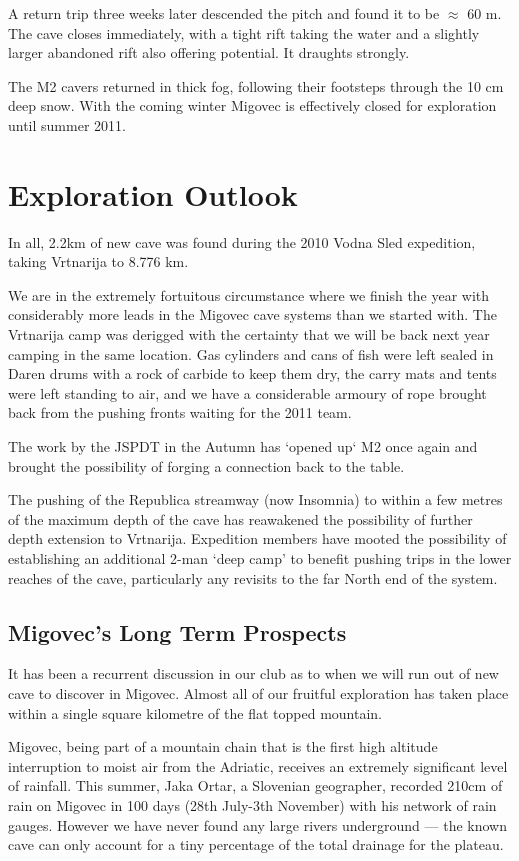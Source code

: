 A return trip three weeks later descended the pitch and found it to be
$\approx$ 60 m. The cave closes immediately, with a tight rift taking the water
and a slightly larger abandoned rift also offering potential. It draughts
strongly.

The M2 cavers returned in thick fog, following their footsteps through the 10
cm deep snow. With the coming winter Migovec is effectively closed for
exploration until summer 2011.

\section{Exploration Outlook}

In all, 2.2km of new cave was found during the 2010 Vodna Sled expedition,
taking Vrtnarija to 8.776 km.

We are in the extremely fortuitous circumstance where we finish the year with
considerably more leads in the Migovec cave systems than we started with.  The Vrtnarija camp
was derigged with the certainty that we will be back next year camping in the
same location. Gas cylinders and cans of fish were left sealed in Daren drums
with a rock of carbide to keep them dry, the carry mats and tents were left
standing to air, and we have a considerable armoury of rope brought back from
the pushing fronts waiting for the 2011 team.

The work by the JSPDT in the Autumn has `opened up` M2 once again and brought
the possibility of forging a connection back to the table. 

The pushing of the Republica streamway (now Insomnia) to within a few metres of
the maximum depth of the cave has reawakened the possibility of further depth
extension to Vrtnarija. Expedition members have mooted the possibility of
establishing an additional 2-man `deep camp' to benefit pushing trips in the
lower reaches of the cave, particularly any revisits to the far North end of
the system.

\subsection{Migovec's Long Term Prospects}

It has been a recurrent discussion in our club as to when we will run out of
new cave to discover in Migovec. Almost all of our fruitful exploration has
taken place within a single square kilometre of the flat topped mountain. 

Migovec, being part of a mountain chain that is the first high altitude
interruption to moist air from the Adriatic, receives an extremely significant
level of rainfall. This summer, Jaka Ortar, a Slovenian geographer, recorded
210cm of rain on Migovec in 100 days (28th July-3th November) with his network
of rain gauges. However we have never found any large rivers underground ---
the known cave can only account for a tiny percentage of the total drainage for
the plateau.

